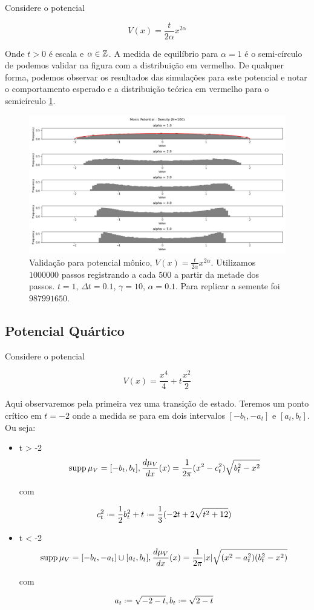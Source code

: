 Considere o potencial

\[
	V(x) = \frac{t}{2\alpha} x^{2\alpha}
\]

Onde $t > 0$ é escala e $\alpha \in \mathbb{Z}$. A medida de equilíbrio para $\alpha = 1$ é o semi-círculo de podemos validar na figura com a distribuição em vermelho. De qualquer forma, podemos observar os resultados das simulações para este potencial e notar o comportamento esperado e a distribuição teórica em vermelho para o semicírculo \ref{fig: monic}.


\begin{figure}[ht!]
	\centering
	\includegraphics[scale=0.45]{Assets/validationArticleMonic}
	\caption{Validação para potencial mônico, $V(x) = \frac{t}{2 \alpha} x^{2\alpha}$. Utilizamos $1000000$ passos registrando a cada $500$ a partir da metade dos passos. $t = 1$, $\Delta t = 0.1$, $\gamma = 10$, $\alpha = 0.1$. Para replicar a semente foi $987991650$.}
	\label{fig: monic}
\end{figure}


\subsection{Potencial Quártico}

Considere o potencial

\[
	V(x) = \frac{x^4}{4} + t \frac{x^2}{2}
\]

Aqui observaremos pela primeira vez uma transição de estado. Teremos um ponto crítico em $t=-2$ onde a medida se para em dois intervalos $[-b_t, -a_t]$ e $[a_t, b_t]$. Ou seja:

\begin{itemize}
	\item t > -2
	\[
	\operatorname{supp} \mu_V = [-b_t, b_t], \frac{d \mu_V}{dx}(x) = \frac{1}{2\pi} (x^2 - c_t^2) \sqrt{b_t^2 - x^2} 
	\]
	
	com
	
	\[
		c_t^2 \deff\frac{1}{2} b_t^2 + t \deff \frac{1}{3} (-2t + 2 \sqrt{t^2 + 12})
	\]
	
	\item t < -2
	\[
	\operatorname{supp} \mu_V = [-b_t, -a_t] \cup [a_t, b_t], \frac{d \mu_V}{dx}(x) = \frac{1}{2\pi} |x| \sqrt{(x^2 - a_t^2)(b_t^2 - x^2)} 
	\]
	
	com
	
	\[
	a_t \deff \sqrt{-2-t}, b_t \deff \sqrt{2-t}
	\]
\end{itemize}

